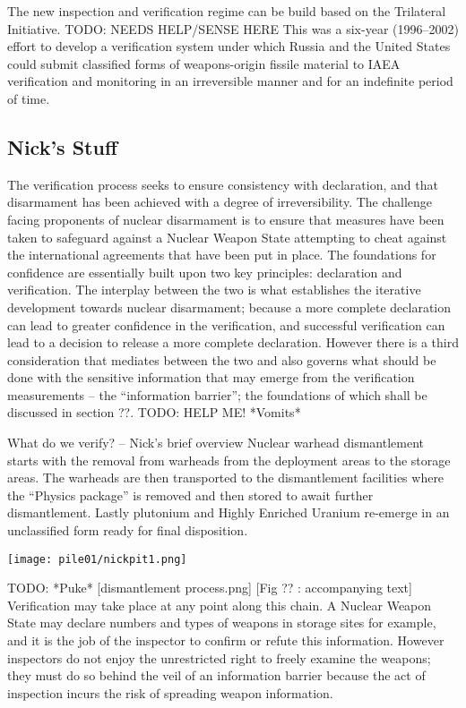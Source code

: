 \documentclass[twoside,titlepage,11pt,twocolumn,a4paper]{article}
\begin{document}
The new inspection and verification regime can be build based on the
Trilateral Initiative. \citep{zarimpas2003} TODO: NEEDS HELP/SENSE HERE This was a six-year
(1996--2002) effort to develop a verification system under which
Russia and the United States could submit classified forms of
weapons-origin fissile material to 
IAEA verification and monitoring in an irreversible manner and for
an indefinite period of time.

\subsection{Nick's Stuff}
The verification process seeks to ensure consistency with declaration,
and that disarmament has been achieved with a degree of
irreversibility.  The challenge facing proponents of nuclear
disarmament is to ensure that measures have been taken to safeguard
against a Nuclear Weapon State attempting to cheat against the
international agreements that have been put in place. The foundations
for confidence are essentially built upon two key principles:
declaration and verification. The interplay between the two is what
establishes the iterative development towards nuclear disarmament;
because a more complete declaration can lead to greater confidence in
the verification, and successful verification can lead to a decision
to release a more complete declaration. However there is a third
consideration that mediates between the two and also governs what
should be done with the sensitive information that may emerge from the
verification measurements -- the ``information barrier''; the
foundations of which shall be discussed in section ??.
TODO: HELP ME! *Vomits*

What do we verify? -- Nick’s brief overview Nuclear warhead
dismantlement starts with the removal from warheads from the
deployment areas to the storage areas. The warheads are then
transported to the dismantlement facilities where the ``Physics
package'' is removed and then stored to await further
dismantlement. Lastly plutonium and Highly Enriched Uranium re-emerge
in an unclassified form ready for final disposition.

\begin{figure*}
  \texttt{[image: pile01/nickpit1.png]}
\end{figure*}

TODO: *Puke*
[dismantlement process.png] [Fig ?? : accompanying text] \citep{IPFN2009}
Verification may take place at any
point along this chain. A Nuclear Weapon State may declare numbers and
types of weapons in storage sites for example, and it is the job of
the inspector to confirm or refute this information.  However
inspectors do not enjoy the unrestricted right to freely examine the
weapons; they must do so behind the veil of an information barrier
because the act of inspection incurs the risk of spreading weapon
information.
\end{document}
